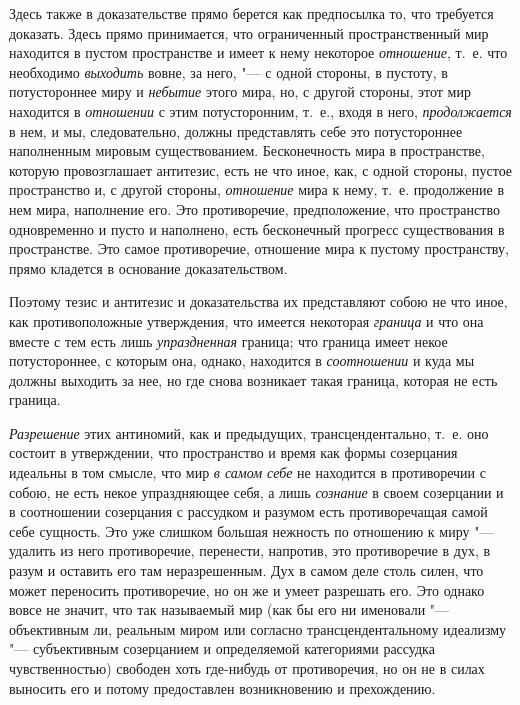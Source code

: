 Здесь также в доказательстве прямо берется как предпосылка то, что требуется
доказать. Здесь прямо принимается, что ограниченный пространственный мир
находится в пустом пространстве и имеет к нему некоторое
{\em отношение}, т.~е. что необходимо
{\em выходить} вовне, за него, "--- с одной стороны, в
пустоту, в потустороннее миру и {\em небытие} этого
мира, но, с другой стороны, этот мир находится в
{\em отношении} с этим потусторонним, т.~е., входя в
него, {\em продолжается} в нем, и мы, следовательно,
должны представлять себе это потустороннее наполненным мировым
существованием. Бесконечность мира в пространстве, которую провозглашает
антитезис, есть не что иное, как, с одной стороны, пустое пространство и, с
другой стороны, {\em отношение} мира к нему, т.~е.
продолжение в нем мира, наполнение его. Это противоречие, предположение,
что пространство одновременно и пусто и наполнено, есть бесконечный
прогресс существования в пространстве. Это самое противоречие, отношение
мира к пустому пространству, прямо кладется в основание доказательством.

Поэтому тезис и антитезис и доказательства их представляют собою не что
иное, как противоположные утверждения, что имеется некоторая
{\em граница} и что она вместе с тем есть лишь
{\em упраздненная} граница; что граница имеет некое
потустороннее, с которым она, однако, находится в
{\em соотношении} и куда мы должны выходить за нее, но
где снова возникает такая граница, которая не есть граница.

{\em Разрешение} этих антиномий, как и предыдущих,
трансцендентально, т.~е. оно состоит в утверждении, что пространство и
время как формы созерцания идеальны в том смысле, что мир
{\em в самом себе} не находится в противоречии с собою,
не есть некое упраздняющее себя, а лишь {\em сознание}
в своем созерцании и в соотношении созерцания с рассудком и разумом есть
противоречащая самой себе сущность. Это уже слишком большая нежность по
отношению к миру "--- удалить из него противоречие, перенести, напротив, это
противоречие в дух, в разум и оставить его там неразрешенным. Дух в самом
деле столь силен, что может переносить противоречие, но он же и умеет
разрешать его. Это однако вовсе не значит, что так называемый мир (как бы
его ни именовали "--- объективным ли, реальным миром или согласно
трансцендентальному идеализму "--- субъективным созерцанием и определяемой
категориями рассудка чувственностью) свободен хоть где-нибудь от
противоречия, но он не в силах выносить его и потому предоставлен
возникновению и прехождению.

